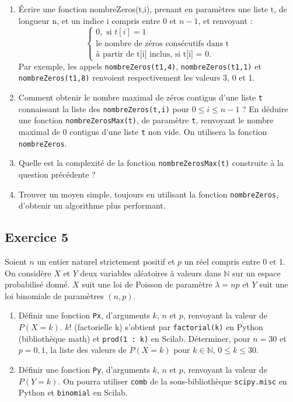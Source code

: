 \documentclass[10pt,fleqn]{article} %
\begin{document}
\begin{multicols}{2}
\begin{enumerate}
\item Écrire une fonction nombreZeros(t,i), prenant en paramètres une liste t, de longueur n, et un indice i compris entre 0 et $n-1$, et renvoyant :
$$
\left\{
\begin{array}{l}
0, \text{ si } t[i]=1 \\
\text{le  nombre de zéros consécutifs dans t} \\ \text{à partir de t[i] inclus, si t[i] = 0}.
\end{array}
\right.
$$
Par exemple, les appels \texttt{nombreZeros(t1,4)}, \texttt{nombreZeros(t1,1)} et \texttt{nombreZeros(t1,8)} renvoient respectivement les valeurs 3, 0 et 1.
\item Comment obtenir le nombre maximal de zéros contigus d’une liste \texttt{t} connaissant la liste des \texttt{nombreZeros(t,i)} pour $0\leq i \leq n-1$ ?
En déduire une fonction \texttt{nombreZerosMax(t)}, de paramètre \texttt{t}, renvoyant le nombre maximal de 0 contigus d’une liste \texttt{t} non vide. On utilisera la fonction \texttt{nombreZeros}.
\item Quelle est la complexité de la fonction \texttt{nombreZerosMax(t)} construite à la question précédente ?
\item Trouver un moyen simple, toujours en utilisant la fonction \texttt{nombreZeros}, d’obtenir un algorithme plus performant.
\end{enumerate}

\subsection*{Exercice 5}
Soient $n$ un entier naturel strictement positif et $p$ un réel compris entre 0 et 1.
On considère $X$ et $Y$ deux variables aléatoires à valeurs dans $\mathbb{N}$ sur un espace probabilisé donné. $X$ suit une
loi de Poisson de paramètre $\lambda = np$ et $Y$ suit une loi binomiale de paramètres $(n, p)$.

\begin{enumerate}
\item Définir une fonction \texttt{Px}, d’arguments $k$, $n$ et $p$, renvoyant la valeur de $P(X = k)$. $k!$ (factorielle k) s’obtient par \texttt{factorial(k)} en Python (bibliothèque math) et \texttt{prod(1 : k)} en Scilab.
Déterminer, pour $n = 30$ et $p = 0,1$, la liste des valeurs de $P(X = k)$ pour $k \in \mathbb{N}$, $0 \leq k \leq 30 $.
\item Définir une fonction \texttt{Py}, d’arguments $k$, $n$ et $p$, renvoyant la valeur de $P(Y = k)$.
On pourra utiliser \texttt{comb} de la sous-bibliothèque \texttt{scipy.misc} en Python et \texttt{binomial} en Scilab.


\end{enumerate}
\end{multicols}
\end{document}
